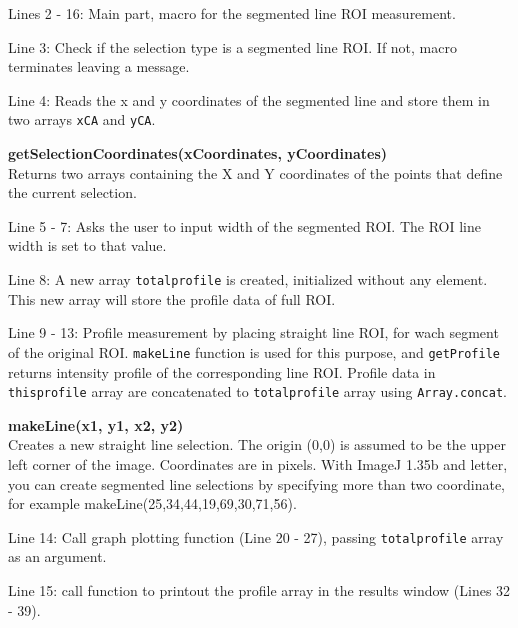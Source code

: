 \documentclass[11pt,a4paper,oneside]{report}
\newenvironment{indentCom}%
{\begin{list}{}%
         {\setlength{\leftmargin}{1em}}%
         \item[]%
}
{\end{list}}
\newcommand{\ilcom}[1]{\texttt{\small#1}}
\begin{document}
\begin{itemize}
\item Lines 2 - 16: Main part, macro for the segmented line ROI measurement.  

\item Line 3: Check if the selection type is a segmented line ROI. If not, macro
terminates leaving a message.

\item Line 4: Reads the x and y coordinates of the segmented line
and store them in two arrays \ilcom{xCA} and \ilcom{yCA}.

\begin{indentCom}
\textbf{getSelectionCoordinates(xCoordinates, yCoordinates)}\\
Returns two arrays containing the X and Y coordinates of the points that define the current selection. 
\end{indentCom}

\item Line 5 - 7: Asks the user to input width of the segmented ROI. The ROI
line width is set to that value.

\item Line 8: A new array \ilcom{totalprofile} is created, initialized without
any element. This new array will store the profile data of full ROI.

\item Line 9 - 13: Profile measurement by placing straight line ROI,
for wach segment of the original ROI. \ilcom{makeLine} function is used for this
purpose, and \ilcom{getProfile} returns intensity profile of the corresponding
line ROI. Profile data in \ilcom{thisprofile} array are concatenated to
\ilcom{totalprofile} array using \ilcom{Array.concat}.

\begin{indentCom}
\textbf{makeLine(x1, y1, x2, y2)}\\
Creates a new straight line selection. The origin (0,0) is assumed to be the upper left corner of the image. Coordinates are in pixels. With ImageJ 1.35b and letter, you can create segmented line selections by specifying more than two coordinate, for example makeLine(25,34,44,19,69,30,71,56).
\end{indentCom}

\item Line 14: Call graph plotting function (Line 20 - 27), passing
\ilcom{totalprofile} array as an argument.

\item Line 15: call function to printout the profile array in the results window
(Lines 32 - 39).


\end{itemize}
\end{document}
